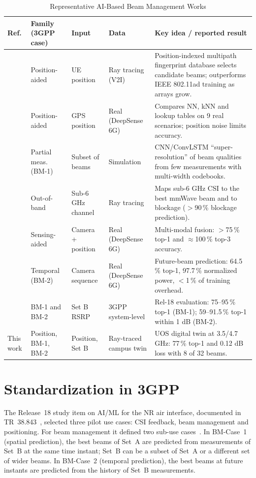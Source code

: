 \documentclass[journal]{IEEEtran}
\begin{document}
\begin{table}[!t]
\caption{Representative AI-Based Beam Management Works}
\label{tab:works}
\centering
\footnotesize
\renewcommand{\arraystretch}{1.12}
\begin{tabular}{@{}l l l l p{6.4cm}@{}}
\toprule
Ref. & Family (3GPP case) & Input & Data & Key idea / reported result \\
\midrule
\cite{va2018inverse} & Position-aided & UE position & Ray tracing (V2I) & Position-indexed multipath fingerprint database selects candidate beams; outperforms IEEE 802.11ad training as arrays grow. \\
\cite{morais2023position} & Position-aided & GPS position & Real (DeepSense 6G) & Compares NN, kNN and lookup tables on 9 real scenarios; position noise limits accuracy. \\
\cite{echigo2021low} & Partial meas. (BM-1) & Subset of beams & Simulation & CNN/ConvLSTM ``super-resolution'' of beam qualities from few measurements with multi-width codebooks. \\
\cite{alrabeiah2020sub6} & Out-of-band & Sub-6 GHz channel & Ray tracing & Maps sub-6 GHz CSI to the best mmWave beam and to blockage ($>$90\,\% blockage prediction). \\
\cite{charan2022vision} & Sensing-aided & Camera + position & Real (DeepSense 6G) & Multi-modal fusion: $>$75\,\% top-1 and $\approx$100\,\% top-3 accuracy. \\
\cite{jiang2022tracking} & Temporal (BM-2) & Camera sequence & Real (DeepSense 6G) & Future-beam prediction: 64.5\,\% top-1, 97.7\,\% normalized power, $<$1\,\% of training overhead. \\
\cite{jayaweera2024bm} & BM-1 and BM-2 & Set B RSRP & 3GPP system-level & Rel-18 evaluation: 75--95\,\% top-1 (BM-1); 59--91.5\,\% top-1 within 1 dB (BM-2). \\
This work & Position, BM-1, BM-2 & Position, Set B & Ray-traced campus twin & UOS digital twin at 3.5/4.7 GHz: 77\,\% top-1 and 0.12 dB loss with 8 of 32 beams. \\
\bottomrule
\end{tabular}
\end{table}

\section{Standardization in 3GPP}
\label{sec:std}
The Release~18 study item on AI/ML for the NR air interface, documented in TR~38.843~\cite{3gpp38843}, selected three pilot use cases: CSI feedback, beam management and positioning. For beam management it defined two sub-use cases~\cite{xue2023standard}. In BM-Case~1 (spatial prediction), the best beams of Set~A are predicted from measurements of Set~B at the same time instant; Set~B can be a subset of Set~A or a different set of wider beams. In BM-Case~2 (temporal prediction), the best beams at future instants are predicted from the history of Set~B measurements.
\end{document}
